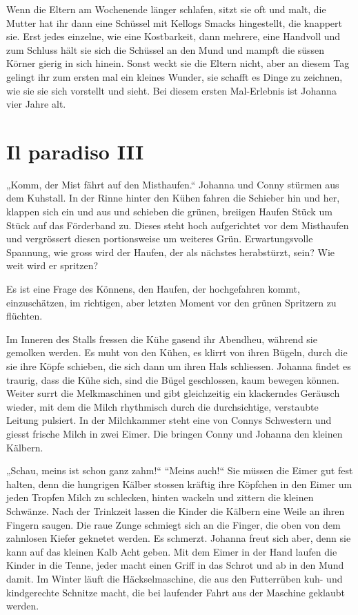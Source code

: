 \documentclass[10pt,titlepage,a5paper]{book}
\begin{document}
Wenn die Eltern am Wochenende länger schlafen, sitzt sie oft und malt, die Mutter hat ihr dann eine Schüssel mit Kellogs Smacks hingestellt, die knappert sie. Erst jedes einzelne, wie eine Kostbarkeit, dann mehrere, eine Handvoll und zum Schluss hält sie sich die Schüssel an den Mund und mampft die süssen Körner gierig in sich hinein. Sonst weckt sie die Eltern nicht, aber an diesem Tag gelingt ihr zum ersten mal ein kleines Wunder, sie schafft es Dinge zu zeichnen, wie sie sie sich vorstellt und sieht. Bei diesem ersten Mal-Erlebnis ist Johanna vier Jahre alt.



\section*{Il paradiso III}



„Komm, der Mist fährt auf den Misthaufen.“ Johanna und Conny stürmen aus dem Kuhstall. In der Rinne hinter den Kühen fahren die Schieber hin und her, klappen sich ein und aus und schieben die grünen, breiigen Haufen Stück um Stück auf das Förderband zu. Dieses steht hoch aufgerichtet vor dem Misthaufen und vergrössert diesen portionsweise um weiteres Grün.
Erwartungsvolle Spannung, wie gross wird der Haufen, der als nächstes herabstürzt, sein? Wie weit wird er spritzen?

Es ist eine Frage des Könnens, den Haufen, der hochgefahren kom\-mt, einzuschätzen, im richtigen, aber letzten Moment vor den grü\-nen Spritzern zu flüchten.

Im Inneren des Stalls fressen die Kühe gasend ihr Abendheu, währ\-end sie gemolken werden. Es muht von den Kühen, es klirrt von ihren Bügeln, durch die sie ihre Köpfe schieben, die sich dann um ihren Hals schliessen. Johanna findet es traurig, dass die Kühe sich, sind die Bügel geschlossen, kaum bewegen können. Weiter surrt die Melkmaschinen und gibt gleichzeitig ein klackerndes Geräusch wieder, mit dem die Milch rhythmisch durch die durchsichtige, verstaubte Leitung pulsiert. In der Milchkammer steht eine von Connys Schwestern und giesst frische Milch in zwei Eimer. Die bringen Conny und Johanna den kleinen Kälbern. 

„Schau, meins ist schon ganz zahm!“ “Meins auch!“ Sie müssen die Eimer gut fest halten, denn die hungrigen Kälber stossen kräftig ihre Köpfchen in den Eimer um jeden Tropfen Milch zu schlecken, hinten wackeln und zittern die kleinen Schwänze. Nach der Trinkzeit lassen die Kinder die Kälbern eine Weile an ihren Fingern saugen. Die raue Zunge schmiegt sich an die Finger, die oben von dem zahnlosen Kiefer geknetet werden. Es schmerzt. Johanna freut sich aber, denn sie kann auf  das kleinen Kalb Acht geben. Mit dem Eimer in der Hand laufen die Kinder in die Tenne, jeder macht einen Griff in das Schrot und ab in den Mund damit. Im Winter läuft die Häckselmaschine, die aus den Futterrüben kuh- und kindgerechte Schnitze macht, die bei laufender Fahrt aus der Maschine geklaubt werden.
\end{document}
